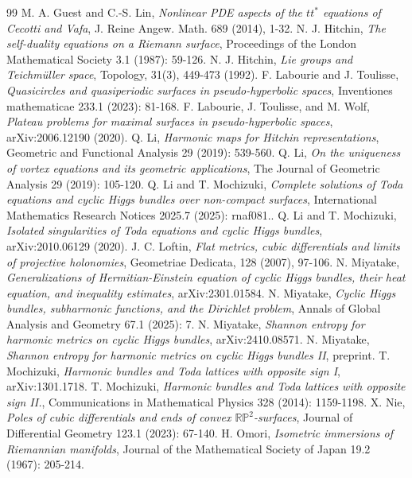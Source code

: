 \documentclass[12pt]{article}
\theoremstyle{definition}
\begin{document}
\begin{thebibliography}{99}
 M. A. Guest and C.-S. Lin, {\it Nonlinear PDE aspects of the $tt^\ast$ equations of Cecotti and Vafa}, J. Reine Angew. Math. 689 (2014), 1-32.
 N. J. Hitchin, {\it The self-duality equations on a Riemann surface}, Proceedings of the London Mathematical Society 3.1 (1987): 59-126.
 N. J. Hitchin, {\it Lie groups and Teichm\"uller space}, Topology, 31(3), 449-473 (1992).
 F. Labourie and J. Toulisse, {\it Quasicircles and quasiperiodic surfaces in pseudo-hyperbolic spaces}, Inventiones mathematicae 233.1 (2023): 81-168.
 F. Labourie, J. Toulisse, and M. Wolf, {\it Plateau problems for maximal surfaces in pseudo-hyperbolic spaces}, arXiv:2006.12190 (2020).
 Q. Li, {\it Harmonic maps for Hitchin representations}, Geometric and Functional Analysis 29 (2019): 539-560.
 Q. Li, {\it On the uniqueness of vortex equations and its geometric applications}, The Journal of Geometric Analysis 29 (2019): 105-120.
Q. Li and T. Mochizuki, {\it Complete solutions of Toda equations and cyclic Higgs bundles over non-compact surfaces}, International Mathematics Research Notices 2025.7 (2025): rnaf081..
 Q. Li and T. Mochizuki, {\it Isolated singularities of Toda equations and cyclic Higgs bundles}, arXiv:2010.06129 (2020).
 J. C. Loftin, {\it Flat metrics, cubic differentials and limits of projective holonomies}, Geometriae Dedicata, 128 (2007), 97-106.
 N. Miyatake, {\it Generalizations of Hermitian-Einstein equation of cyclic Higgs bundles, their heat equation, and inequality estimates}, arXiv:2301.01584.
 N. Miyatake, {\it Cyclic Higgs bundles, subharmonic functions, and the Dirichlet problem}, Annals of Global Analysis and Geometry 67.1 (2025): 7.
 N. Miyatake, {\it Shannon entropy for harmonic metrics on cyclic Higgs bundles}, arXiv:2410.08571.
 N. Miyatake, {\it Shannon entropy for harmonic metrics on cyclic Higgs bundles II}, preprint.
 T. Mochizuki, {\it Harmonic bundles and Toda lattices with opposite sign I}, arXiv:1301.1718.
 T. Mochizuki, {\it Harmonic bundles and Toda lattices with opposite sign II.}, Communications in Mathematical Physics 328 (2014): 1159-1198.
 X. Nie, {\it Poles of cubic differentials and ends of convex $\mathbb {RP}^ 2$-surfaces}, Journal of Differential Geometry 123.1 (2023): 67-140.
 H. Omori, {\it Isometric immersions of Riemannian manifolds}, Journal of the Mathematical Society of Japan 19.2 (1967): 205-214.

\end{thebibliography}
\end{document}
